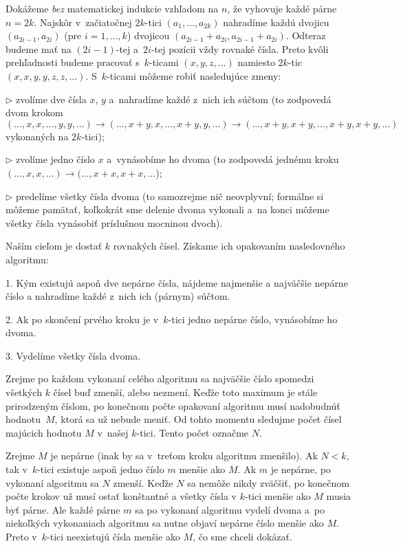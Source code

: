 {\ineriesenie
{}
Dokážeme {\it bez\/} matematickej indukcie vzhľadom na $n$, že vyhovuje každé párne $n=2k$.
Najskôr v~začiatočnej $2k$-tici $(a_1,\dots,a_{2k})$ nahradíme
každú dvojicu $(a_{2i-1},a_{2i})$ (pre $i=1,\dots,k$) dvojicou
$(a_{2i-1}+a_{2i},a_{2i-1}+a_{2i})$. Odteraz budeme mať na $(2i-1)$-tej a~$2i$-tej pozícii vždy
rovnaké čísla. Preto kvôli prehľadnosti budeme pracovať s~$k$-ticami $(x,y,z,\dots)$ namiesto $2k$-tic
$(x,x,y,y,z,z,\dots)$. S~$k$-ticami môžeme robiť nasledujúce zmeny:
\item{$\triangleright$}
zvolíme dve čísla $x$, $y$ a~nahradíme každé z~nich ich súčtom
(to zodpovedá dvom krokom $(\dots,x,x,\dots,y,y,\dots)\to
(\dots,x+y,x,\dots,x+y,y,\dots)\to(\dots,x+y,x+y,\dots,x+y,x+y,\dots)$
vykonaných na $2k$-tici);
\item{$\triangleright$} zvolíme jedno číslo $x$ a~vynásobíme ho dvoma
(to zodpovedá jednému kroku $(\dots,x,x,\dots)\to(\dots,x+x,x+x,\dots$);
\item{$\triangleright$} predelíme všetky čísla dvoma (to samozrejme nič neovplyvní; formálne si môžeme pamätať, koľkokrát sme delenie dvoma vykonali a~na konci môžeme všetky čísla vynásobiť príslušnou mocninou dvoch).

Naším cieľom je dostať $k$ rovnakých čísel. Získame ich opakovaním nasledovného algoritmu:
\item{1.} Kým existujú aspoň dve nepárne čísla, nájdeme najmenšie a najväčšie nepárne číslo a nahradíme každé z~nich ich (párnym) súčtom.
\item{2.} Ak po skončení prvého kroku je v~$k$-tici jedno nepárne číslo, vynásobíme ho dvoma.
\item{3.} Vydelíme všetky čísla dvoma.

Zrejme po každom vykonaní celého algoritmu sa najväčšie číslo spomedzi všetkých $k$ čísel buď zmenší, alebo nezmení. Keďže toto maximum je stále prirodzeným číslom, po konečnom počte opakovaní algoritmu musí nadobudnúť hodnotu~$M$, ktorá sa už nebude meniť. Od tohto momentu sledujme počet čísel majúcich hodnotu $M$
v~našej $k$-tici. Tento počet označme $N$.

Zrejme $M$ je nepárne (inak by sa v~treťom kroku algoritmu zmenšilo). Ak $N<k$, tak v~$k$-tici existuje aspoň jedno číslo $m$ menšie ako $M$. Ak $m$ je nepárne, po vykonaní algoritmu sa $N$ zmenší. Keďže $N$ sa nemôže nikdy zväčšiť, po konečnom počte krokov už musí ostať konštantné a všetky čísla v $k$-tici menšie ako $M$ musia byť párne. Ale každé párne $m$ sa po vykonaní algoritmu vydelí dvoma a~po niekoľkých vykonaniach algoritmu sa nutne objaví nepárne číslo menšie ako $M$. Preto v~$k$-tici neexistujú čísla menšie ako $M$, čo sme chceli dokázať.
}

